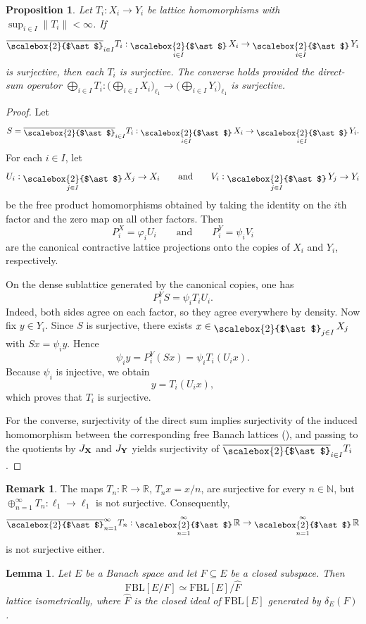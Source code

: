 \documentclass[12pt]{amsart}
\newcommand{\FBL}{\mathrm{FBL}}
\DeclareMathOperator*{\bigfree}{\raisebox{-0.6ex}{\scalebox{2}{$\ast$}}}
\theoremstyle{plain}
\newtheorem{lemma}[theorem]{Lemma}
\newtheorem{proposition}[theorem]{Proposition}
\theoremstyle{definition}
\newtheorem{remark}[theorem]{Remark}
\begin{document}
\begin{proposition}\label{prop:surjective-factors}
Let $T_i:X_i\to Y_i$ be lattice homomorphisms with $\sup_{i\in I}\|T_i\|<\infty$. If
\[
\overline{\bigfree}_{i\in I}T_i:\bigfree_{i\in I}X_i\to \bigfree_{i\in I}Y_i
\]
is surjective, then each $T_i$ is surjective. The converse holds provided the direct-sum operator $\bigoplus_{i\in I}T_i:\Big(\bigoplus_{i\in I}X_i\Big)_{\ell_1}\to \Big(\bigoplus_{i\in I}Y_i\Big)_{\ell_1}$
is surjective.
\end{proposition}

\begin{proof}
Let
\[
S=\overline{\bigfree}_{i\in I}T_i:\bigfree_{i\in I}X_i\to \bigfree_{i\in I}Y_i.
\]
For each $i\in I$, let
\[
U_i:\bigfree_{j\in I}X_j\to X_i
\qquad\text{and}\qquad
V_i:\bigfree_{j\in I}Y_j\to Y_i
\]
be the free product homomorphisms obtained by taking the identity on the $i$th factor and the zero map on all other factors. Then
\[
P_i^X=\varphi_iU_i
\qquad\text{and}\qquad
P_i^Y=\psi_iV_i
\]
are the canonical contractive lattice projections onto the copies of $X_i$ and $Y_i$, respectively.

On the dense sublattice generated by the canonical copies, one has
\[
P_i^Y S=\psi_i T_i U_i.
\]
Indeed, both sides agree on each factor, so they agree everywhere by density. Now fix $y\in Y_i$. Since $S$ is surjective, there exists $x\in \bigfree_{j\in I}X_j$ with $Sx=\psi_i y$. Hence
\[
\psi_i y=P_i^Y(Sx)=\psi_i T_i(U_i x).
\]
Because $\psi_i$ is injective, we obtain
\[
y=T_i(U_i x),
\]
which proves that $T_i$ is surjective.

For the converse, surjectivity of the direct sum implies surjectivity of the induced homomorphism between the corresponding free Banach lattices (\cite[Proposition 3.2]{freebanlat}), and passing to the quotients by $J_{\bold{X}}$ and $J_{\bold{Y}}$ yields surjectivity of $\overline{\bigfree}_{i\in I}T_i$.
\end{proof}



\begin{remark}
The maps $T_n:\mathbb{R}\to \mathbb{R}$, $T_nx=x/n$, are surjective for every $n\in \mathbb{N}$, but $\oplus_{n=1}^\infty T_n:\ell_1\to \ell_1$ is not surjective. Consequently,
\[
\overline{\bigfree}_{n=1}^\infty T_n:\bigfree_{n=1}^\infty\mathbb{R}\to \bigfree_{n=1}^\infty\mathbb{R}
\]
is not surjective either.
\end{remark}

\begin{lemma}\label{lem:FBL-quotient}
Let $E$ be a Banach space and let $F\subseteq E$ be a closed subspace. Then
\[
\FBL[E/F]\simeq \FBL[E]/\widehat{F}
\]
lattice isometrically, where $\widehat{F}$ is the closed ideal of $\FBL[E]$ generated by $\delta_E(F)$.
\end{lemma}
\end{document}

